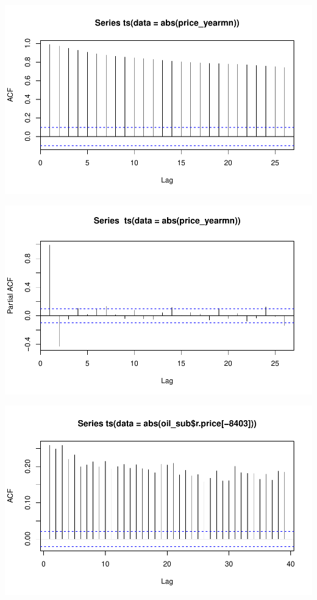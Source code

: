 \documentclass[11pt]{article}\usepackage[]{graphicx}\usepackage[]{color}
\makeatletter
\def\maxwidth{ %
  \ifdim\Gin@nat@width>\linewidth
    \linewidth
  \else
    \Gin@nat@width
  \fi
}
\newenvironment{knitrout}{}{} %
\makeatother
\begin{document}
\begin{knitrout}\footnotesize
{}\color{fgcolor}

{\centering \includegraphics[width=\maxwidth]{figure/abs_plots-1} 

}




{\centering \includegraphics[width=\maxwidth]{figure/abs_plots-2} 

}




{\centering \includegraphics[width=\maxwidth]{figure/abs_plots-3} 

}
\end{knitrout}
\end{document}
